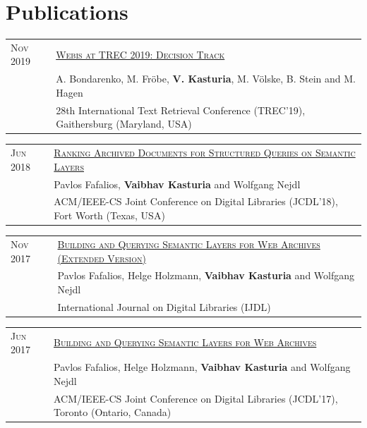 \documentclass[a4paper,10pt]{article} %
\begin{document}

\section{Publications}

\begin{tabular}{ll}
\textsc{Nov 2019} & \href{https://webis.de/downloads/publications/papers/stein_2019zc.pdf}{\textsc{Webis at TREC 2019: Decision Track}}\\
& A. Bondarenko, M. Fröbe, \textbf{V. Kasturia}, M. Völske, B. Stein and M. Hagen \\
& 28th International Text Retrieval Conference (TREC'19), Gaithersburg (Maryland, USA)\\
\end{tabular}

\begin{tabular}{ll}
\textsc{Jun 2018} & \href{https://dl.acm.org/doi/10.1145/3197026.3197049}{\textsc{Ranking Archived Documents for Structured Queries on Semantic Layers}}\\
& Pavlos Fafalios, \textbf{Vaibhav Kasturia} and Wolfgang Nejdl\\
& ACM/IEEE-CS Joint Conference on Digital Libraries (JCDL’18), Fort Worth (Texas, USA)\\
\end{tabular}

\begin{tabular}{ll}
\textsc{Nov 2017} & \href{https://arxiv.org/abs/1810.10455}{\textsc{Building and Querying Semantic Layers for Web Archives (Extended Version)}}\\
& Pavlos Fafalios, Helge Holzmann, \textbf{Vaibhav Kasturia} and Wolfgang Nejdl\\
& International Journal on Digital Libraries (IJDL)\\
\end{tabular}

\begin{tabular}{ll}

\textsc{Jun 2017} & \href{http://ieeexplore.ieee.org/document/7991555/}{\textsc{Building and Querying Semantic Layers for Web Archives}}\\
& Pavlos Fafalios, Helge Holzmann, \textbf{Vaibhav Kasturia} and Wolfgang Nejdl\\
& ACM/IEEE-CS Joint Conference on Digital Libraries (JCDL’17), Toronto (Ontario, Canada)\\
\end{tabular}
\end{document}
